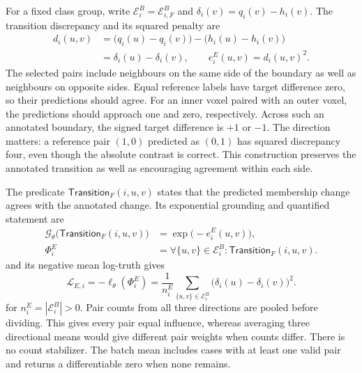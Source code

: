 \documentclass[12pt,a4paper]{article}
\begin{document}
For a fixed class group, write $\mathcal E_i^B=\mathcal E_{i,F}^B$
and $\delta_i(v)=q_i(v)-h_i(v)$. The transition discrepancy and its
squared penalty are
\begin{equation}
\begin{aligned}
d_i(u,v)
 &=\bigl(q_i(u)-q_i(v)\bigr)
   -\bigl(h_i(u)-h_i(v)\bigr)\\
 &=\delta_i(u)-\delta_i(v),
\qquad e_i^{E}(u,v)=d_i(u,v)^2.
\end{aligned}
\label{eq:edge-transition-discrepancy}
\end{equation}
The selected pairs include neighbours on the same side of the boundary
as well as neighbours on opposite sides. Equal reference labels have
target difference zero, so their predictions should agree. For an inner
voxel paired with an outer voxel, the predictions should approach one
and zero, respectively. Across such an annotated boundary, the signed
target difference is $+1$ or $-1$. The direction matters: a
reference pair $(1,0)$ predicted as $(0,1)$ has squared discrepancy four,
even though the absolute contrast is correct. This construction preserves
the annotated transition as well as encouraging agreement within each
side.

The predicate $\mathsf{Transition}_F(i,u,v)$ states that the predicted
membership change agrees with the annotated change. Its exponential
grounding and quantified statement are
\begin{equation}
\begin{aligned}
\mathcal{G}_{\theta}\bigl(\mathsf{Transition}_{F}(i,u,v)\bigr)
 &=\exp\bigl(-e_i^E(u,v)\bigr),\\
\Phi_i^E
 &=\forall\{u,v\}\in\mathcal{E}_i^B:
     \mathsf{Transition}_{F}(i,u,v).
\end{aligned}
\label{eq:edge-logical-statement}
\end{equation}
and its negative mean log-truth gives
\begin{equation}
\mathcal{L}_{E,i}
=-\ell_{\theta}(\Phi_i^E)
=\frac{1}{n_i^E}\sum_{\{u,v\}\in\mathcal{E}_i^B}
   \bigl(\delta_i(u)-\delta_i(v)\bigr)^2.
\label{eq:edge-case-loss}
\end{equation}
for $n_i^E=|\mathcal E_i^B|>0$. Pair counts from all three directions
are pooled before dividing. This gives every pair equal influence,
whereas averaging three directional means would give different pair
weights when counts differ. There is no count stabilizer. The batch
mean includes cases with at least one valid pair and returns a
differentiable zero when none remains.
\end{document}
